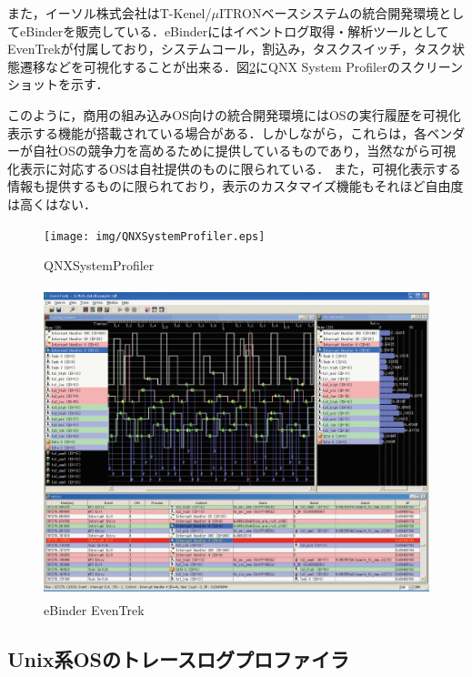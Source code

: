 また，イーソル株式会社はT-Kenel/$\mu$ITRONベースシステムの統合開発環境としてeBinder\cite{eBinder}を販売している．eBinderにはイベントログ取得・解析ツールとしてEvenTrekが付属しており，システムコール，割込み，タスクスイッチ，タスク状態遷移などを可視化することが出来る．図\ref{fig:EvenTrek}にQNX System Profilerのスクリーンショットを示す．

このように，商用の組み込みOS向けの統合開発環境にはOSの実行履歴を可視化表示する機能が搭載されている場合がある．しかしながら，これらは，各ベンダーが自社OSの競争力を高めるために提供しているものであり，当然ながら可視化表示に対応するOSは自社提供のものに限られている．
また，可視化表示する情報も提供するものに限られており，表示のカスタマイズ機能もそれほど自由度は高くはない．

\begin{figure}[p]
\begin{center}
\texttt{[image: img/QNXSystemProfiler.eps]}
\caption{QNXSystemProfiler}
\label{fig:QNXSystemProfiler}
\end{center}
\end{figure}

\begin{figure}[p]
\begin{center}
\includegraphics[height=9cm]{img/EvenTrek.eps}
\caption{eBinder EvenTrek}
\label{fig:EvenTrek}
\end{center}
\end{figure}

\subsection{Unix系OSのトレースログプロファイラ}

